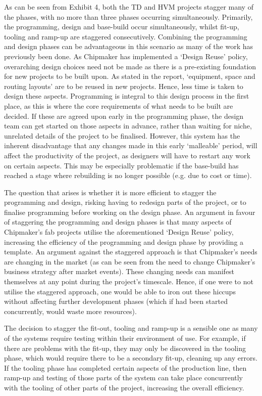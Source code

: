 \documentclass[11pt]{article}
\begin{document}
As can be seen from Exhibit 4, both the TD and HVM projects stagger many of the phases, with no more than three phases occurring simultaneously. Primarily, the programming, design and base-build occur simultaneously, whilst fit-up, tooling and ramp-up are staggered consecutively. Combining the programming and design phases can be advantageous in this scenario as many of the work has previously been done. As Chipmaker has implemented a `Design Reuse' policy, overarching design choices need not be made as there is a pre-existing foundation for new projects to be built upon. As stated in the report, `equipment, space and routing layouts' are to be reused in new projects. Hence, less time is taken to design these aspects. Programming is integral to this design process in the first place, as this is where the core requirements of what needs to be built are decided. If these are agreed upon early in the programming phase, the design team can get started on those aspects in advance, rather than waiting for niche, unrelated details of the project to be finalised. However, this system has the inherent disadvantage that any changes made in this early `malleable' period, will affect the productivity of the project, as designers will have to restart any work on certain aspects. This may be especially problematic if the base-build has reached a stage where rebuilding is no longer possible (e.g. due to cost or time). 

The question that arises is whether it is more efficient to stagger the programming and design, risking having to redesign parts of the project, or to finalise programming before working on the design phase. An argument in favour of staggering the programming and design phases is that many aspects of Chipmaker's fab projects utilise the aforementioned `Design Reuse' policy, increasing the efficiency of the programming and design phase by providing a template. An argument against the staggered approach is that Chipmaker's needs are changing in the market (as can be seen from the need to change Chipmaker's business strategy after market events). These changing needs can manifest themselves at any point during the project's timescale. Hence, if one were to not utilise the staggered approach, one would be able to iron out these hiccups without affecting further development phases (which if had been started concurrently, would waste more resources). 

The decision to stagger the fit-out, tooling and ramp-up is a sensible one as many of the systems require testing within their environment of use. For example, if there are problems with the fit-up, they may only be discovered in the tooling phase, which would require there to be a secondary fit-up, cleaning up any errors. If the tooling phase has completed certain aspects of the production line, then ramp-up and testing of those parts of the system can take place concurrently with the tooling of other parts of the project, increasing the overall efficiency. 
\end{document}
